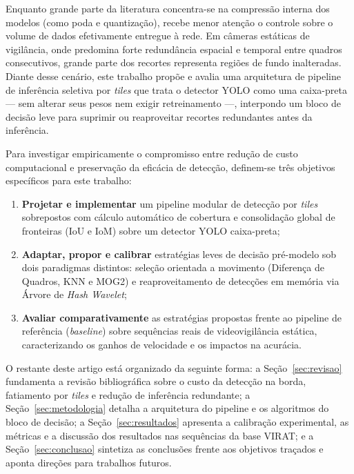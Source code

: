 \documentclass{ieeeaccess}
\begin{document}
Enquanto grande parte da literatura concentra-se na compressão interna dos modelos (como poda e quantização), recebe menor atenção o controle sobre o volume de dados efetivamente entregue à rede. Em câmeras estáticas de vigilância, onde predomina forte redundância espacial e temporal entre quadros consecutivos, grande parte dos recortes representa regiões de fundo inalteradas. Diante desse cenário, este trabalho propõe e avalia uma arquitetura de pipeline de inferência seletiva por \textit{tiles} que trata o detector YOLO como uma caixa-preta --- sem alterar seus pesos nem exigir retreinamento ---, interpondo um bloco de decisão leve para suprimir ou reaproveitar recortes redundantes antes da inferência.

Para investigar empiricamente o compromisso entre redução de custo computacional e preservação da eficácia de detecção, definem-se três objetivos específicos para este trabalho:
\begin{enumerate}
    \item \textbf{Projetar e implementar} um pipeline modular de detecção por \textit{tiles} sobrepostos com cálculo automático de cobertura e consolidação global de fronteiras ($\mathrm{IoU}$ e $\mathrm{IoM}$) sobre um detector YOLO caixa-preta;
    \item \textbf{Adaptar, propor e calibrar} estratégias leves de decisão pré-modelo sob dois paradigmas distintos: seleção orientada a movimento (Diferença de Quadros, KNN e MOG2) e reaproveitamento de detecções em memória via Árvore de \textit{Hash Wavelet};
    \item \textbf{Avaliar comparativamente} as estratégias propostas frente ao pipeline de referência (\textit{baseline}) sobre sequências reais de videovigilância estática, caracterizando os ganhos de velocidade e os impactos na acurácia.
\end{enumerate}

O restante deste artigo está organizado da seguinte forma: a Seção~\ref{sec:revisao} fundamenta a revisão bibliográfica sobre o custo da detecção na borda, fatiamento por \textit{tiles} e redução de inferência redundante; a Seção~\ref{sec:metodologia} detalha a arquitetura do pipeline e os algoritmos do bloco de decisão; a Seção~\ref{sec:resultados} apresenta a calibração experimental, as métricas e a discussão dos resultados nas sequências da base VIRAT; e a Seção~\ref{sec:conclusao} sintetiza as conclusões frente aos objetivos traçados e aponta direções para trabalhos futuros.

\end{document}
